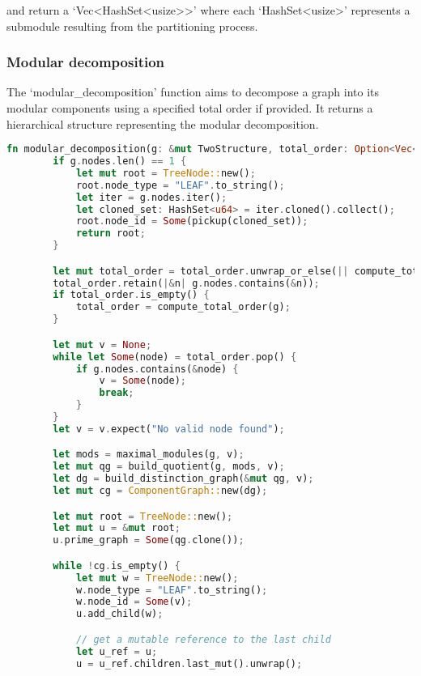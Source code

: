 and return a `Vec\textless HashSet\textless usize\textgreater\textgreater' where each `HashSet\textless usize\textgreater' represents a submodule resulting from the partitioning process.


\subsubsection{Modular decomposition}

The `modular\_decomposition' function aims to decompose a graph into its modular components using a specified total order if provided.
It returns a hierarchical structure representing the modular decomposition.

\begin{lstlisting}[language=Rust, style=rust, caption={Defining the modular decomposition with Rust}, label={lst:rust-define-modular-decomposition}, firstnumber=1]
    fn modular_decomposition(g: &mut TwoStructure, total_order: Option<Vec<u64>>) -> TreeNode {
        if g.nodes.len() == 1 {
            let mut root = TreeNode::new();
            root.node_type = "LEAF".to_string();
            let iter = g.nodes.iter();
            let cloned_set: HashSet<u64> = iter.cloned().collect();
            root.node_id = Some(pickup(cloned_set));
            return root;
        }

        let mut total_order = total_order.unwrap_or_else(|| compute_total_order(g));
        total_order.retain(|&n| g.nodes.contains(&n));
        if total_order.is_empty() {
            total_order = compute_total_order(g);
        }

        let mut v = None;
        while let Some(node) = total_order.pop() {
            if g.nodes.contains(&node) {
                v = Some(node);
                break;
            }
        }
        let v = v.expect("No valid node found");

        let mods = maximal_modules(g, v);
        let mut qg = build_quotient(g, mods, v);
        let dg = build_distinction_graph(&mut qg, v);
        let mut cg = ComponentGraph::new(dg);

        let mut root = TreeNode::new();
        let mut u = &mut root;
        u.prime_graph = Some(qg.clone());

        while !cg.is_empty() {
            let mut w = TreeNode::new();
            w.node_type = "LEAF".to_string();
            w.node_id = Some(v);
            u.add_child(w);

            // get a mutable reference to the last child
            let u_ref = u;
            u = u_ref.children.last_mut().unwrap();


\end{lstlisting}

